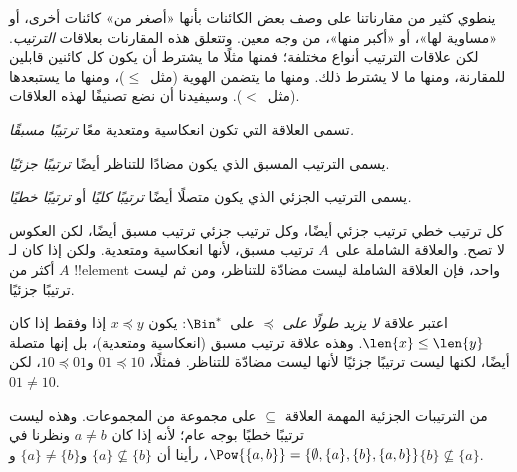 \documentclass[../../../include/open-logic-section]{subfiles}
\begin{document}

\begin{explain}
ينطوي كثير من مقارناتنا على وصف بعض الكائنات بأنها «أصغر من» كائنات أخرى،
أو «مساوية لها»، أو «أكبر منها»، من وجه معين. وتتعلق هذه المقارنات بعلاقات
\emph{الترتيب}. لكن علاقات الترتيب أنواع مختلفة؛ فمنها مثلًا ما يشترط أن
يكون كل كائنين قابلين للمقارنة، ومنها ما لا يشترط ذلك. ومنها ما يتضمن
الهوية (مثل~$\le$)، ومنها ما يستبعدها (مثل~$<$). وسيفيدنا أن نضع تصنيفًا
لهذه العلاقات.
\end{explain}

\begin{defn}
تسمى العلاقة التي تكون انعكاسية ومتعدية معًا
\emph{ترتيبًا مسبقًا.}
\end{defn}

\begin{defn}
يسمى الترتيب المسبق الذي يكون مضادًا للتناظر أيضًا
\emph{ترتيبًا جزئيًا}.
\end{defn}

\begin{defn}
يسمى الترتيب الجزئي الذي يكون متصلًا أيضًا
\emph{ترتيبًا كليًا} أو \emph{ترتيبًا خطيًا.}
\end{defn}

\begin{ex}
كل ترتيب خطي ترتيب جزئي أيضًا، وكل ترتيب جزئي ترتيب مسبق أيضًا، لكن العكوس
لا تصح. والعلاقة الشاملة على~$A$ ترتيب مسبق، لأنها انعكاسية ومتعدية. ولكن
إذا كان لـ$A$ أكثر من !!{element} واحد، فإن العلاقة الشاملة ليست مضادّة
للتناظر، ومن ثم ليست ترتيبًا جزئيًا.
\end{ex}

\begin{ex}
اعتبر علاقة \emph{لا يزيد طولًا على} $\preccurlyeq$
على~$\Bin^*$: يكون $x \preccurlyeq y$ إذا وفقط إذا كان
$\len{x} \le \len{y}$. وهذه علاقة ترتيب مسبق (انعكاسية ومتعدية)، بل إنها
متصلة أيضًا، لكنها ليست ترتيبًا جزئيًا لأنها ليست مضادّة للتناظر. فمثلًا،
$01 \preccurlyeq 10$ و$10 \preccurlyeq 01$، لكن $01 \neq 10$.
\end{ex}

\begin{ex}
من الترتيبات الجزئية المهمة العلاقة $\subseteq$ على مجموعة من المجموعات.
وهذه ليست ترتيبًا خطيًا بوجه عام؛ لأنه إذا كان $a \neq b$ ونظرنا في
$\Pow{\{a, b\}} = \{\emptyset, \{a\}, \{b\}, \{a,b\}\}$، رأينا أن
$\{a\} \nsubseteq \{b\}$ و$\{a\} \neq \{b\}$ و$\{b\}
\nsubseteq \{a\}$.
\end{ex}
\end{document}
